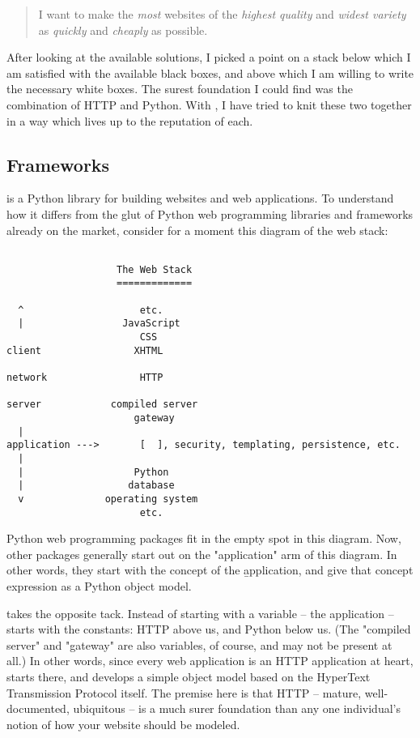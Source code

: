 \begin{quote} I want to make the \emph{most} websites of the \emph{highest
quality} and \emph{widest variety} as \emph{quickly} and \emph{cheaply} as
possible. \end{quote}

After looking at the available solutions, I picked a point on a stack below
which I am satisfied with the available black boxes, and above which I am
willing to write the necessary white boxes. The surest foundation I could find
was the combination of HTTP and Python. With , I have tried to
knit these two together in a way which lives up to the reputation of each.


\subsection{Frameworks \label{frameworks}}

 is a Python library for building websites and web applications.
To understand how it differs from the glut of Python web programming libraries
and frameworks already on the market, consider for a moment this diagram of the
web stack:

\begin{verbatim}

                   The Web Stack
                   =============

  ^                    etc.
  |                 JavaScript
                       CSS
client                XHTML

network                HTTP

server            compiled server
                      gateway
  |
application --->       [  ], security, templating, persistence, etc.
  |
  |                   Python
  |                  database
  v              operating system
                       etc.

\end{verbatim}

Python web programming packages fit in the empty spot in this diagram. Now,
other packages generally start out on the "application" arm of this diagram. In
other words, they start with the concept of the \b{application}, and give that
concept expression as a Python object model.

 takes the opposite tack. Instead of starting with a variable --
the application --  starts with the constants: HTTP above us, and
Python below us. (The "compiled server" and "gateway" are also variables, of
course, and may not be present at all.) In other words, since every web
application is an HTTP application at heart,  starts there, and
develops a simple object model based on the HyperText Transmission Protocol
itself. The premise here is that HTTP -- mature, well-documented, ubiquitous --
is a much surer foundation than any one individual's notion of how your website
should be modeled.

